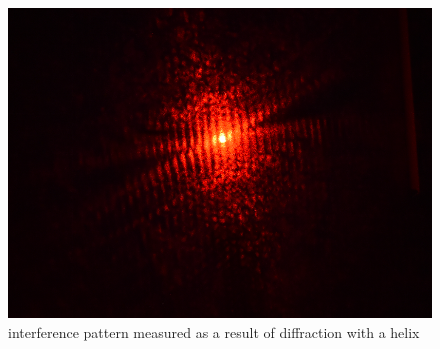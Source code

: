\begin{figure}[H]
    \includegraphics[width=0.9\columnwidth]{figures/expantion meshured interferemce.png}
    \caption{interference pattern measured as a result of diffraction with a helix}
    \label{fig:expansion measured interference pattern}
\end{figure}